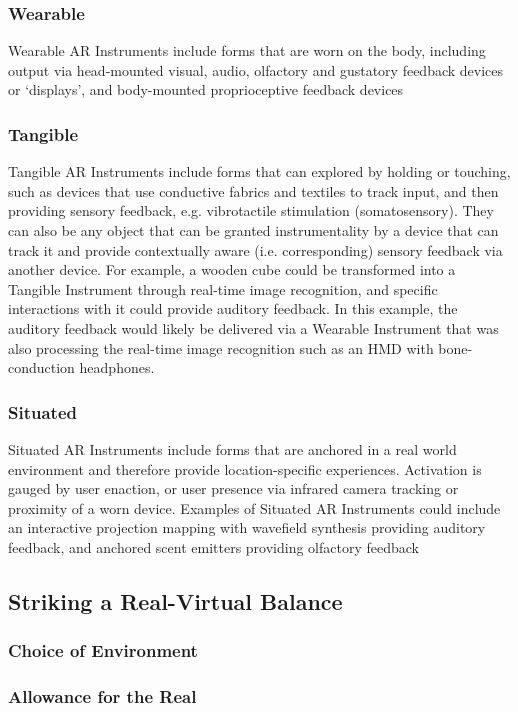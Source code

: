 \subsubsection{Wearable}
Wearable AR Instruments include forms that are worn on the body, including output via head-mounted visual, audio, olfactory and gustatory feedback devices or `displays', and body-mounted proprioceptive feedback devices

\subsubsection{Tangible}
Tangible AR Instruments include forms that can explored by holding or touching, such as devices that use conductive fabrics and textiles to track input, and then providing sensory feedback, e.g. vibrotactile stimulation (somatosensory). They can also be any object that can be granted instrumentality by a device that can track it and provide contextually aware (i.e. corresponding) sensory feedback via another device. For example, a wooden cube could be transformed into a Tangible Instrument through real-time image recognition, and specific interactions with it could provide auditory feedback. In this example, the auditory feedback would likely be delivered via a Wearable Instrument that was also processing the real-time image recognition such as an HMD with bone-conduction headphones.

\subsubsection{Situated}
Situated AR Instruments include forms that are anchored in a real world environment and therefore provide location-specific experiences. Activation is gauged by user enaction, or user presence via infrared camera tracking or proximity of a worn device. Examples of Situated AR Instruments could include an interactive projection mapping with wavefield synthesis providing auditory feedback, and anchored scent emitters providing olfactory feedback

\subsection{Striking a Real-Virtual Balance} \label{sec: method-patterns-environment}
\subsubsection{Choice of Environment}
\subsubsection{Allowance for the Real}
